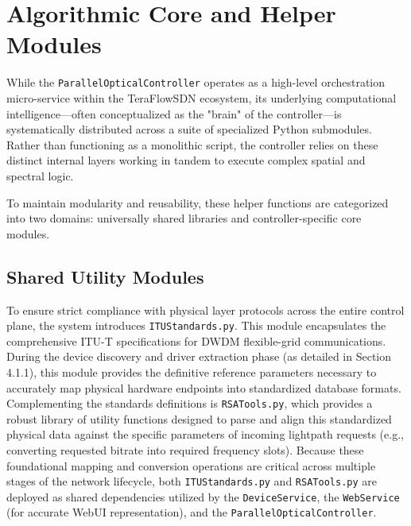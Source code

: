 \section{Algorithmic Core and Helper Modules}
While the \texttt{ParallelOpticalController} operates as a high-level orchestration micro-service within the TeraFlowSDN ecosystem, its underlying computational intelligence—often conceptualized as the "brain" of the controller—is systematically distributed across a suite of specialized Python submodules. Rather than functioning as a monolithic script, the controller relies on these distinct internal layers working in tandem to execute complex spatial and spectral logic.

To maintain modularity and reusability, these helper functions are categorized into two domains: universally shared libraries and controller-specific core modules.
\subsection*{\small Shared Utility Modules}
To ensure strict compliance with physical layer protocols across the entire control plane, the system introduces \texttt{ITUStandards.py}. This module encapsulates the comprehensive ITU-T specifications for DWDM flexible-grid communications. During the device discovery and driver extraction phase (as detailed in Section 4.1.1), this module provides the definitive reference parameters necessary to accurately map physical hardware endpoints into standardized database formats. Complementing the standards definitions is \texttt{RSATools.py}, which provides a robust library of utility functions designed to parse and align this standardized physical data against the specific parameters of incoming lightpath requests (e.g., converting requested bitrate into required frequency slots). Because these foundational mapping and conversion operations are critical across multiple stages of the network lifecycle, both \texttt{ITUStandards.py} and \texttt{RSATools.py} are deployed as shared dependencies utilized by the \texttt{DeviceService}, the \texttt{WebService} (for accurate WebUI representation), and the \texttt{ParallelOpticalController}.
